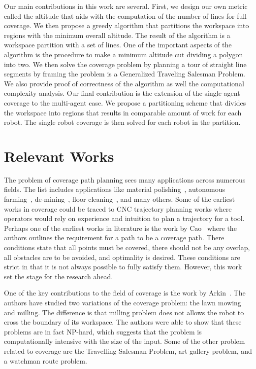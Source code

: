 \documentclass[../main.tex]{subfiles}
\begin{document}
Our main contributions in this work are several. First, we design our own metric called the altitude that aids with the computation of the number of lines for full coverage. We then propose a greedy algorithm that partitions the workspace into regions with the minimum overall altitude. The result of the algorithm is a workspace partition with a set of lines. One of the important aspects of the algorithm is the procedure to make a minimum altitude cut dividing a polygon into two. We then solve the coverage problem by planning a tour of straight line segments by framing the problem is a Generalized Traveling Salesman Problem. We also provide proof of correctness of the algorithm as well the computational complexity analysis. Our final contribution is the extension of the single-agent coverage to the multi-agent case. We propose a partitioning scheme that divides the workspace into regions that results in comparable amount of work for each robot. The single robot coverage is then solved for each robot in the partition. 

\section{Relevant Works}
\label{sec:relevant_works}

The problem of coverage path planning sees many applications across numerous fields. The list includes applications like material polishing~\cite{rososhansky2010coverage}, autonomous farming~\cite{ollis1997vision}, de-mining~\cite{acar2003path}, floor cleaning~\cite{yasutomi1988cleaning}, and many others. Some of the earliest works in coverage could be traced to CNC trajectory planning works where operators would rely on experience and intuition to plan a trajectory for a tool. Perhaps one of the earliest works in literature is the work by Cao~\cite{cao1988region} where the authors outlines the requirement for a path to be a coverage path. There conditions state that all points must be covered, there should not be any overlap, all obstacles are to be avoided, and optimality is desired. These conditions are strict in that it is not always possible to fully satisfy them. However, this work set the stage for the research ahead.

One of the key contributions to the field of coverage is the work by Arkin~\cite{arkin2000approximation}. The authors have studied two variations of the coverage problem: the lawn mowing and milling. The difference is that milling problem does not allows the robot to cross the boundary of its workspace. The authors were able to show that these problems are in fact NP-hard, which suggests that the problem is computationally intensive with the size of the input. Some of the other problem related to coverage are the Travelling Salesman Problem, art gallery problem, and a watchman route problem.
\end{document}
